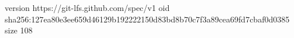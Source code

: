 version https://git-lfs.github.com/spec/v1
oid sha256:127ea80e3ee659d46129b192222150d83bd8b70c7f3a89cea69fd7cbaf0d0385
size 108
